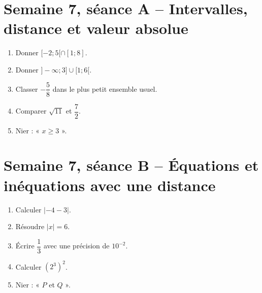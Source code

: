 \section{Semaine 7, séance A -- Intervalles, distance et valeur absolue}
\begin{enumerate}
  \item Donner $[-2;5[\cap[1;8]$.
  \item Donner $]-\infty;3]\cup[1;6[$.
  \item Classer $-\dfrac58$ dans le plus petit ensemble usuel.
  \item Comparer $\sqrt{11}$ et $\dfrac72$.
  \item Nier : « $x\geq 3$ ».
\end{enumerate}
\TeacherOnly{%
\begin{tcolorbox}[colback=VE!3,colframe=VE!35,boxrule=.4pt,arc=1mm]
\small\textit{Réponses.}\quad \textbf{1.} $[1;5[$. \quad \textbf{2.} $]-\infty;6[$. \quad \textbf{3.} $\D$. \quad \textbf{4.} $\sqrt{11}<\dfrac72$. \quad \textbf{5.} $x<3$.
\end{tcolorbox}}

\section{Semaine 7, séance B -- Équations et inéquations avec une distance}
\begin{enumerate}
  \item Calculer $|{-4}-3|$.
  \item Résoudre $|x|=6$.
  \item Écrire $\dfrac13$ avec une précision de $10^{-2}$.
  \item Calculer $(2^3)^2$.
  \item Nier : « $P$ et $Q$ ».
\end{enumerate}

